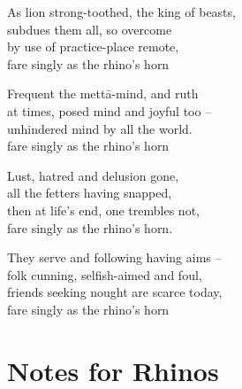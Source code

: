 \begin{MyDescription}{}  	
As lion strong-toothed, the king of beasts,\\
subdues them all, so overcome\\
by use of practice-place remote,\\
fare singly as the rhino's horn
\end{MyDescription}

\begin{MyDescription}{}  	
Frequent the mett\=a-mind, and ruth\\
at times, posed mind and joyful too –\\
unhindered mind by all the world.\\
fare singly as the rhino's horn
\end{MyDescription}   

\begin{MyDescription}{}  	
Lust, hatred and delusion gone,\\
all the fetters having snapped,\\
then at life's end, one trembles not,\\
fare singly as the rhino's horn.
\end{MyDescription} 
  
\begin{MyDescription}{}  	
They serve and following having aims – \\
folk cunning, selfish-aimed and foul,\\
friends seeking nought are scarce today,\\
fare singly as the rhino's horn
\end{MyDescription} 
\begin{MyDescription}[(Sn. 35 - 75)]{}
\end{MyDescription} 
\newpage
\section{Notes for Rhinos}
   
